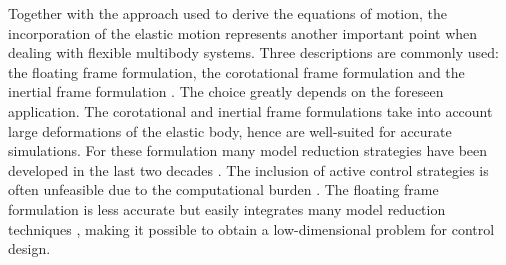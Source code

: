\documentclass{svjour3}                     %
\newcommand{\firstRev}[1]{\textcolor{red!80!black}{#1}}
\begin{document}
	\indent Together with the approach used to derive the equations of motion, the incorporation of the elastic motion represents another important point when dealing with flexible multibody systems. Three descriptions are commonly used: the floating frame formulation, the corotational frame formulation and the inertial frame formulation \cite{Ellenbroek2018}. The choice greatly depends on the foreseen application.  The corotational and inertial frame formulations take into account large deformations of the elastic body, hence are well-suited for accurate simulations. \firstRev{For these formulation many model reduction strategies have been developed in the last two decades \cite{rong2019}.} The inclusion of active control strategies is often unfeasible due to the computational burden \cite{Noor_rev}. The floating frame formulation is less accurate but easily integrates many model reduction techniques \cite{NOWAKOWSKI201240}, making it possible to obtain a low-dimensional problem for control design. \\
\end{document}
